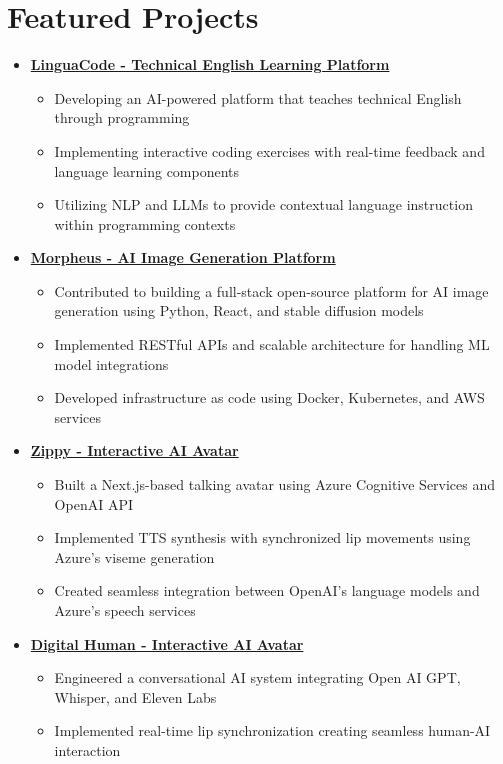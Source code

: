 \documentclass[letterpaper,11pt]{article}
\newcommand{\normalfaExternalLink}{{\mdseries\faExternalLink}}
\begin{document}
\section{Featured Projects}
\begin{itemize}[leftmargin=*, itemsep=1pt]
    \item \textbf{\href{https://github.com/asanchezyali/linguacode}{LinguaCode - Technical English Learning Platform \normalfaExternalLink}}
    \begin{itemize}[itemsep=0pt]
        \item Developing an AI-powered platform that teaches technical English through programming
        \item Implementing interactive coding exercises with real-time feedback and language learning components
        \item Utilizing NLP and LLMs to provide contextual language instruction within programming contexts
    \end{itemize}

    \item \textbf{\href{https://github.com/Monadical-SAS/Morpheus}{Morpheus - AI Image Generation Platform \normalfaExternalLink}}
    \begin{itemize}[itemsep=0pt]
        \item Contributed to building a full-stack open-source platform for AI image generation using Python, React, and stable diffusion models
        \item Implemented RESTful APIs and scalable architecture for handling ML model integrations
        \item Developed infrastructure as code using Docker, Kubernetes, and AWS services
    \end{itemize}
    
    \item \textbf{\href{https://github.com/asanchezyali/ai-avatar}{Zippy - Interactive AI Avatar \normalfaExternalLink}}
    \begin{itemize}[itemsep=0pt]
        \item Built a Next.js-based talking avatar using Azure Cognitive Services and OpenAI API
        \item Implemented TTS synthesis with synchronized lip movements using Azure's viseme generation
        \item Created seamless integration between OpenAI's language models and Azure's speech services
    \end{itemize}

    \item \textbf{\href{https://github.com/asanchezyali/talking-avatar-with-ai}{Digital Human - Interactive AI Avatar \normalfaExternalLink}}
    \begin{itemize}[itemsep=0pt]
        \item Engineered a conversational AI system integrating Open AI GPT, Whisper, and Eleven Labs
        \item Implemented real-time lip synchronization creating seamless human-AI interaction
    \end{itemize}
\end{itemize}
\end{document}
